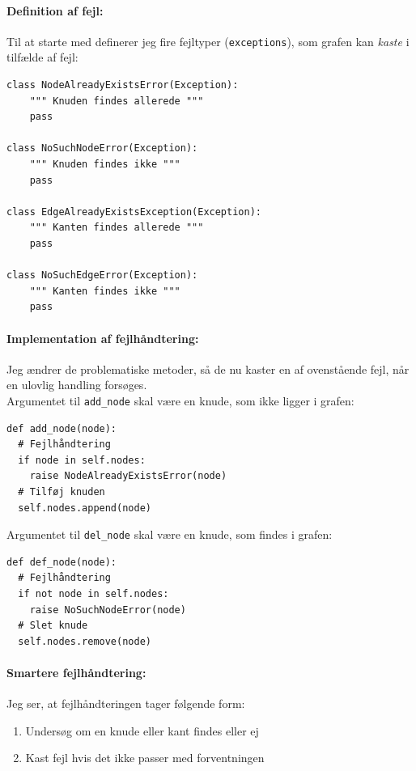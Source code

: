 \documentclass[10pt,a4paper,danish]{article}
\newcommand{\ct}{\texttt}
\begin{document}
\paragraph{Definition af fejl:}
Til at starte med definerer jeg fire fejltyper (\ct{exceptions}), som
grafen kan \textit{kaste} i tilfælde af fejl:
{\small
\begin{verbatim}
class NodeAlreadyExistsError(Exception):
    """ Knuden findes allerede """
    pass

class NoSuchNodeError(Exception):
    """ Knuden findes ikke """
    pass

class EdgeAlreadyExistsException(Exception):
    """ Kanten findes allerede """
    pass

class NoSuchEdgeError(Exception):
    """ Kanten findes ikke """
    pass
\end{verbatim}}

\paragraph{Implementation af fejlhåndtering:}
Jeg ændrer de problematiske metoder, så de nu kaster en af
ovenstående fejl, når en ulovlig handling forsøges.\\

Argumentet til \ct{add\_node} skal være en knude, som ikke ligger i
grafen:
{\small
\begin{verbatim}
def add_node(node):
  # Fejlhåndtering
  if node in self.nodes:
    raise NodeAlreadyExistsError(node)
  # Tilføj knuden
  self.nodes.append(node)
\end{verbatim}}

Argumentet til \ct{del\_node} skal være en knude, som findes i grafen:
{\small
\begin{verbatim}
def def_node(node):
  # Fejlhåndtering
  if not node in self.nodes:
    raise NoSuchNodeError(node)
  # Slet knude
  self.nodes.remove(node)
\end{verbatim}}

\paragraph{Smartere fejlhåndtering:}
Jeg ser, at fejlhåndteringen tager følgende form:
\begin{enumerate}
\item Undersøg om en knude eller kant findes eller ej
\item Kast fejl hvis det ikke passer med forventningen
\end{enumerate}
\end{document}
